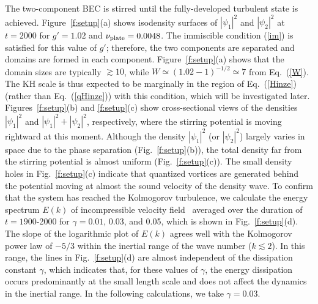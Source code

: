 \documentclass[pra,aps,superscriptaddress,twocolumn]{revtex4-2}
\begin{document}
The two-component BEC is stirred until the fully-developed turbulent state
is achieved.
Figure~\ref{f:setup}(a) shows isodensity surfaces of $|\psi_1|^2$ and
$|\psi_2|^2$ at $t = 2000$ for $g' = 1.02$ and $\nu_{\rm plate} = 0.0048$.
The immiscible condition (\ref{im}) is satisfied for this value of $g'$;
therefore, the two components are separated and domains are formed in
each component.
Figure~\ref{f:setup}(a) shows that the domain sizes are typically
$\gtrsim 10$, while $W \simeq (1.02 - 1)^{-1/2} \simeq 7$ from Eq.~(\ref{W}).
The KH scale is thus expected to be marginally in the region of
Eq.~(\ref{Hinze}) (rather than Eq.~(\ref{qHinze})) with this condition,
which will be investigated later.
Figures~\ref{f:setup}(b) and \ref{f:setup}(c) show cross-sectional views of
the densities $|\psi_1|^2$ and $|\psi_1|^2 + |\psi_2|^2$, respectively,
where the stirring potential is moving rightward at this moment.
Although the density $|\psi_1|^2$ (or $|\psi_2|^2$) largely varies in space
due to the phase separation (Fig.~\ref{f:setup}(b)), the total density far
from the stirring potential is almost uniform (Fig.~\ref{f:setup}(c)).
The small density holes in Fig.~\ref{f:setup}(c) indicate that quantized
vortices are generated behind the potential moving at almost the sound
velocity of the density wave.
To confirm that the system has reached the Kolmogorov turbulence, we
calculate the energy spectrum $E(k)$ of incompressible velocity
field~\cite{Nore} averaged over the duration of $t = 1900$-2000 for
$\gamma = 0.01$, 0.03, and 0.05, which is shown in Fig.~\ref{f:setup}(d).
The slope of the logarithmic plot of $E(k)$ agrees well with the Kolmogorov
power law of $-5 / 3$ within the inertial range of the wave number ($k
\lesssim 2$).
In this range, the lines in Fig.~\ref{f:setup}(d) are almost independent of
the dissipation constant $\gamma$, which indicates that, for these values of
$\gamma$, the energy dissipation occurs predominantly at the small length
scale and does not affect the dynamics in the inertial range.
In the following calculations, we take $\gamma = 0.03$.
\end{document}
